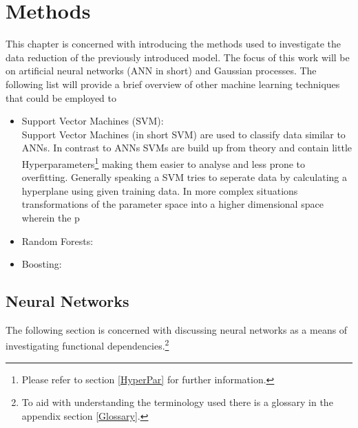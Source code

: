 \chapter{Methods}
	This chapter is concerned with introducing the methods used to investigate the data reduction of the previously introduced model. The focus of this work will be on artificial neural networks (ANN in short) and Gaussian processes.
	The following list will provide a brief overview of other machine learning techniques that could be employed to 
	\begin{itemize}
		\item Support Vector Machines (SVM):\\
		Support Vector Machines (in short SVM) are used to classify data similar to ANNs. In contrast to ANNs SVMs are build up from theory and contain little Hyperparameters\footnote{Please refer to section \ref{HyperPar} for further information.} making them easier to analyse and less prone to overfitting. Generally speaking a SVM tries to seperate data by calculating a hyperplane using given training data. In more complex situations transformations of the parameter space into a higher dimensional space wherein the p
		\item Random Forests:\\
		\item Boosting:\\
	\end{itemize}
	\section{Neural Networks}
		The following section is concerned with discussing neural networks as a means of investigating functional dependencies.\footnote{To aid with understanding the terminology used there is a glossary in the appendix section \ref{Glossary}.}\\		
